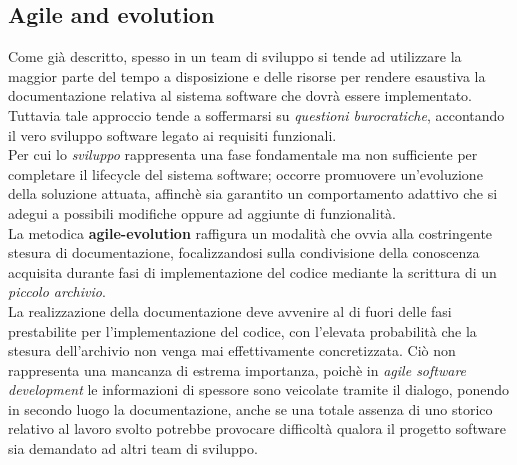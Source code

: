\documentclass{article}
\begin{document}
\subsection*{Agile and evolution}
\large
Come già descritto, spesso in un team di sviluppo si tende ad utilizzare la maggior parte del tempo a disposizione e delle risorse per rendere esaustiva la documentazione relativa al sistema software che dovrà essere implementato. Tuttavia tale approccio tende a soffermarsi su \textit{questioni burocratiche}, accontando il vero sviluppo software legato ai requisiti funzionali.\vspace*{14pt}\\
Per cui lo \textit{sviluppo} rappresenta una fase fondamentale ma non sufficiente per completare il lifecycle del sistema software; occorre promuovere un'evoluzione della soluzione attuata, affinchè sia garantito un comportamento adattivo che si adegui a possibili modifiche oppure ad aggiunte di funzionalità.\vspace*{14pt}\\
La metodica \textbf{agile-evolution} raffigura un modalità che ovvia alla costringente stesura di documentazione, focalizzandosi sulla condivisione della conoscenza acquisita durante fasi di implementazione del codice mediante la scrittura di un \textit{piccolo archivio}.\vspace*{14pt}\\
La realizzazione della documentazione deve avvenire al di fuori delle fasi prestabilite per l'implementazione del codice, con l'elevata probabilità che la stesura dell'archivio non venga mai effettivamente concretizzata. Ciò non rappresenta una mancanza di estrema importanza, poichè in \textit{agile software development} le informazioni di spessore sono veicolate tramite il dialogo, ponendo in secondo luogo la documentazione, anche se una totale assenza di uno storico relativo al lavoro svolto potrebbe provocare difficoltà qualora il progetto software sia demandato ad altri team di sviluppo.
\end{document}
